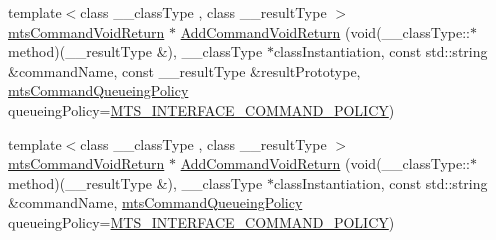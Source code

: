 {\bf }\par
\begin{DoxyCompactItemize}
\item 
{\footnotesize template$<$class \+\_\+\+\_\+class\+Type , class \+\_\+\+\_\+result\+Type $>$ }\\\hyperlink{classmts_command_void_return}{mts\+Command\+Void\+Return} $\ast$ \hyperlink{classmts_interface_provided_a3581289439afcdc0bd93120ae896e45e}{Add\+Command\+Void\+Return} (void(\+\_\+\+\_\+class\+Type\+::$\ast$method)(\+\_\+\+\_\+result\+Type \&), \+\_\+\+\_\+class\+Type $\ast$class\+Instantiation, const std\+::string \&command\+Name, const \+\_\+\+\_\+result\+Type \&result\+Prototype, \hyperlink{mts_forward_declarations_8h_aa2ac24035e136fa1689dcc2854c63fc7}{mts\+Command\+Queueing\+Policy} queueing\+Policy=\hyperlink{mts_forward_declarations_8h_aa2ac24035e136fa1689dcc2854c63fc7a4f444b4120a5e2efd084e2e5a214f5c8}{M\+T\+S\+\_\+\+I\+N\+T\+E\+R\+F\+A\+C\+E\+\_\+\+C\+O\+M\+M\+A\+N\+D\+\_\+\+P\+O\+L\+I\+C\+Y})
\item 
{\footnotesize template$<$class \+\_\+\+\_\+class\+Type , class \+\_\+\+\_\+result\+Type $>$ }\\\hyperlink{classmts_command_void_return}{mts\+Command\+Void\+Return} $\ast$ \hyperlink{classmts_interface_provided_a6fcfd4d08641e7ee3e428c8be4f33d22}{Add\+Command\+Void\+Return} (void(\+\_\+\+\_\+class\+Type\+::$\ast$method)(\+\_\+\+\_\+result\+Type \&), \+\_\+\+\_\+class\+Type $\ast$class\+Instantiation, const std\+::string \&command\+Name, \hyperlink{mts_forward_declarations_8h_aa2ac24035e136fa1689dcc2854c63fc7}{mts\+Command\+Queueing\+Policy} queueing\+Policy=\hyperlink{mts_forward_declarations_8h_aa2ac24035e136fa1689dcc2854c63fc7a4f444b4120a5e2efd084e2e5a214f5c8}{M\+T\+S\+\_\+\+I\+N\+T\+E\+R\+F\+A\+C\+E\+\_\+\+C\+O\+M\+M\+A\+N\+D\+\_\+\+P\+O\+L\+I\+C\+Y})
\end{DoxyCompactItemize}

